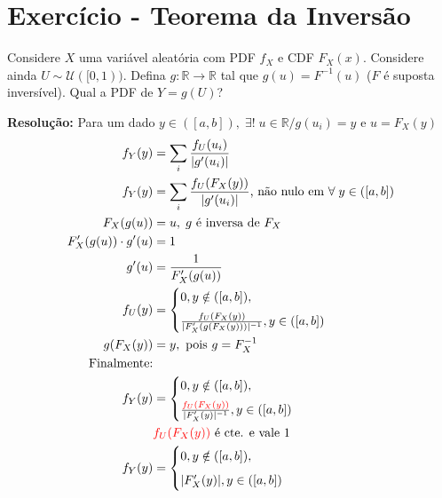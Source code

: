 \documentclass{article}
\makeatletter
\renewcommand\bf[1]{\textbf{#1}}
\newcommand{\bb}[1]{\mathbb{#1}}
\def\mcolor#1#{\@mcolor{#1}}
\def\@mcolor#1#2#3{%
  \protect\leavevmode
  \begingroup
    \color#1{#2}#3%
  \endgroup
}
\makeatother
\begin{document}
\setlength{\abovedisplayskip}{12pt}
\setlength{\belowdisplayskip}{12pt}
\setlength{\abovedisplayshortskip}{0pt}
\setlength{\belowdisplayshortskip}{0pt}
\setlength{\jot}{3pt}

\section{Exercício - Teorema da Inversão}
Considere $X$ uma variável aleatória com PDF $f_X$ e CDF $F_X(x)$. Considere ainda $U \sim
\mathscr{U}([0,1))$. Defina $g:\bb{R} \rightarrow \bb{R}$ tal que $g(u) = F^{-1}(u)$ ($F$ é suposta
inversível). Qual a PDF de $Y=g(U)$?

\bf{Resolução:} Para um dado $y \in ([a,b]), \; \exists! \; u \in \bb{R} / g(u_i) = y$ e $u =
F_X(y)$
\begin{align*}
    f_Y(y) &= \sum_i \frac{f_U(u_i)}{|g'(u_i)|} \\
    f_Y(y) &= \sum_i \frac{f_U(F_X(y))}{|g'(u_i)|} \text{, não nulo em } \forall \; y \in ([a,b]) \\
    F_X(g(u)) &= u, \; g \text{ é inversa de } F_X \\
    F_X'(g(u)) \cdot g'(u) &= 1 \\
    g'(u) &= \frac{1}{F_X'(g(u))} \\
    f_U(y) &=
        \begin{cases}
            0, y \notin ([a,b]), \\[0.5em]
            \frac{f_U(F_X(y))}{|F_X'(g(F_X(y)))|^{-1}}, y \in ([a,b]) \\
        \end{cases} \\
        g(F_X(y)) &= y, \text{ pois } g = F_X^{-1} \\
        \text{Finalmente:} \\
    f_Y(y) &=
        \begin{cases}
            0, y \notin ([a,b]), \\[0.5em]
            \frac{\mcolor{red}{f_U(F_X(y))}}{|F_X'(y)|^{-1}}, y \in ([a,b]) \\
        \end{cases} \\
    &\mcolor{red}{f_U(F_X(y))} \text{ é cte. e vale 1} \\
    f_Y(y) &=
        \begin{cases}
            0, y \notin ([a,b]), \\[0.5em]
            |F_X'(y)|, y \in ([a,b]) \\

\end{cases}
\end{align*}
\end{document}
